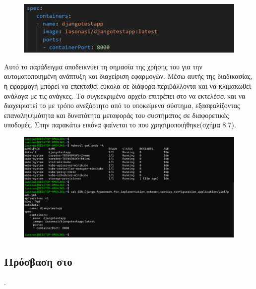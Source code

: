 \FloatBarrier

\begin{figure}[h]
	\centering
	\includegraphics[width=1.0\textwidth]{graphics/pod_spec.png}
	\caption{}
\end{figure}

\FloatBarrier

Αυτό το παράδειγμα αποδεικνύει τη σημασία της χρήσης του  
για την αυτοματοποιημένη ανάπτυξη και διαχείριση  
εφαρμογών. Μέσω αυτής της διαδικασίας, η εφαρμογή μπορεί να 
επεκταθεί εύκολα σε διάφορα περιβάλλοντα και να κλιμακωθεί 
ανάλογα με τις ανάγκες. Το συγκεκριμένο αρχείο  
επιτρέπει στο  να εκτελέσει και να διαχειριστεί το 
 με τρόπο ανεξάρτητο από το υποκείμενο σύστημα, 
εξασφαλίζοντας επαναληψιμότητα και δυνατότητα μεταφοράς του 
συστήματος σε διαφορετικές υποδομές. Στην παρακάτω εικόνα φαίνεται το 
 που χρησιμοποιήθηκε(σχήμα 8.7). 

\FloatBarrier

\begin{figure}[h]
	\centering
	\includegraphics[width=1.0\textwidth]{graphics/deploy_django.png}
	\caption{}
\end{figure}

\FloatBarrier

\subsection{Πρόσβαση στο }.

